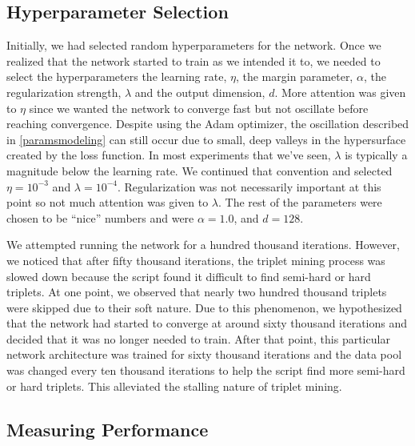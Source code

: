 \subsection{Hyperparameter Selection}

Initially, we had selected random hyperparameters for the network. Once we realized that the network started to train as we intended it to, we needed to select the hyperparameters the learning rate, $\eta$, the margin parameter, $\alpha$, the regularization strength, $\lambda$ and the output dimension, $d$. More attention was given to $\eta$ since we wanted the network to converge fast but not oscillate before reaching convergence. Despite using the Adam optimizer, the oscillation described in \cref{paramsmodeling} can still occur due to small, deep valleys in the hypersurface created by the loss function. In most experiments that we've seen, $\lambda$ is typically a magnitude below the learning rate. We continued that convention and selected $\eta = 10^{-3}$ and $\lambda=10^{-4}$. Regularization was not necessarily important at this point so not much attention was given to $\lambda$.  The rest of the parameters were chosen to be ``nice'' numbers and were $\alpha = 1.0$, and $d=128$.  

We attempted running the network for a hundred thousand iterations. However, we noticed that after fifty thousand iterations, the triplet mining process was slowed down because the script found it difficult to find semi-hard or hard triplets. At one point, we observed that nearly two hundred thousand triplets were skipped due to their soft nature. Due to this phenomenon, we hypothesized that the network had started to converge at around sixty thousand iterations and decided that it was no longer needed to train. After that point, this particular network architecture was trained for sixty thousand iterations and the data pool was changed every ten thousand iterations to help the script find more semi-hard or hard triplets. This alleviated the stalling nature of triplet mining. 


\subsection{Measuring Performance}

